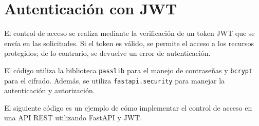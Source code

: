 \chapter{Autenticación con JWT}

\label{AppendixB}
El control de acceso se realiza mediante la verificación de un token JWT que se
envía en las solicitudes. Si el token es válido, se permite el acceso a los
recursos protegidos; de lo contrario, se devuelve un error de autenticación.

El código utiliza la biblioteca \texttt{passlib} para el manejo de contraseñas
y \texttt{bcrypt} para el cifrado. Además, se utiliza \texttt{fastapi.security}
para manejar la autenticación y autorización.

El siguiente código es un ejemplo de cómo implementar el control de acceso en
una API REST utilizando FastAPI y JWT.


